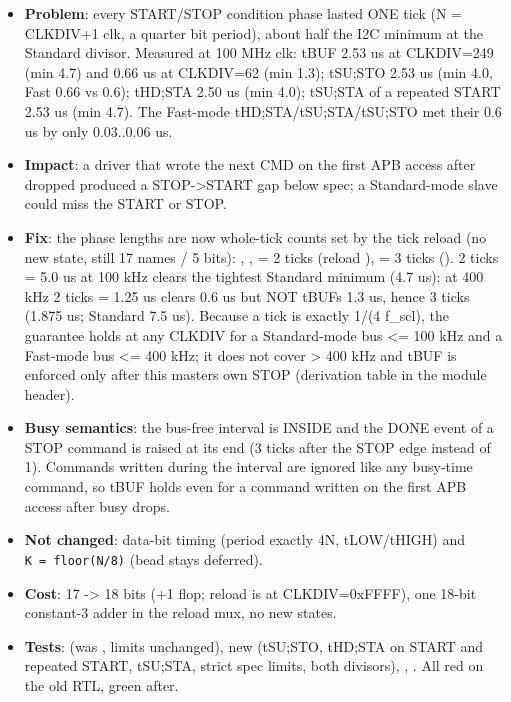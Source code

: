 \begin{record}

\begin{itemize}
\tightlist
\item
  \textbf{Problem}: every START/\allowbreak{}STOP condition phase lasted
  ONE tick (N = CLKDIV+1 clk, a quarter bit period), about half the I2C
  minimum at the Standard divisor. Measured at 100 MHz clk: tBUF 2.53 us
  at CLKDIV=249 (min 4.7) and 0.66 us at CLKDIV=62 (min 1.3); tSU;STO
  2.53 us (min 4.0, Fast 0.66 vs 0.6); tHD;STA 2.50 us (min 4.0);
  tSU;STA of a repeated START 2.53 us (min 4.7). The Fast-mode
  tHD;STA/\allowbreak{}tSU;STA/\allowbreak{}tSU;STO met their 0.6 us by
  only 0.03..0.06 us.
\item
  \textbf{Impact}: a driver that wrote the next CMD on the first APB
  access after  dropped produced a
  STOP-\textgreater START gap below spec; a Standard-mode slave could
  miss the START or STOP.
\item
  \textbf{Fix}: the phase lengths are now whole-tick counts set by the
  tick reload (no new state,  still 17 names / 5 bits):
  , ,  = 2 ticks (reload
  ),  = 3 ticks (). 2 ticks = 5.0
  us at 100 kHz clears the tightest Standard minimum (4.7 us); at 400
  kHz 2 ticks = 1.25 us clears 0.6 us but NOT tBUF\textquotesingle s 1.3
  us, hence 3 ticks (1.875 us; Standard 7.5 us). Because a tick is
  exactly 1/(4 f\_scl), the guarantee holds at any CLKDIV for a
  Standard-mode bus \textless= 100 kHz and a Fast-mode bus \textless=
  400 kHz; it does not cover \textgreater{} 400 kHz and tBUF is enforced
  only after this master\textquotesingle s own STOP (derivation table in
  the module header).
\item
  \textbf{Busy semantics}: the bus-free interval is INSIDE
   and the DONE event of a STOP command is raised at
  its end (3 ticks after the STOP edge instead of 1). Commands written
  during the interval are ignored like any busy-time command, so tBUF
  holds even for a command written on the first APB access after busy
  drops.
\item
  \textbf{Not changed}: data-bit timing (period exactly 4N,
  tLOW/\allowbreak{}tHIGH) and
  \texttt{K\ =\allowbreak{}\ floor(N/\allowbreak{}8)} (bead  stays
  deferred).
\item
  \textbf{Cost}:  17 -\textgreater{} 18 bits (+1 flop;
   reload is  at CLKDIV=0xFFFF), one
  18-bit constant-3 adder in the reload mux, no new states.
\item
  \textbf{Tests}: 
  (was , limits unchanged), new
   (tSU;STO, tHD;STA
  on START and repeated START, tSU;STA, strict spec limits, both
  divisors), ,
  . All red on the
  old RTL, green after.
\end{itemize}


\end{record}
